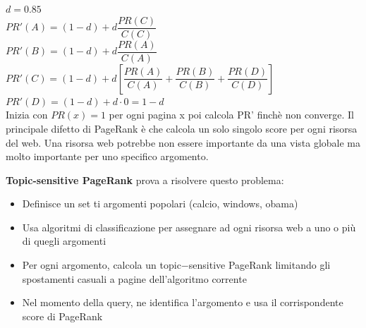 \noindent$d = 0.85$\\

\noindent$PR'(A) = (1 - d) + d\dfrac{PR(C)}{C(C)}$\vspace{0.1cm}\\
$PR'(B) = (1 - d) + d\dfrac{PR(A)}{C(A)}$\vspace{0.1cm}\\
$PR'(C) = (1 - d) + d\left[\dfrac{PR(A)}{C(A)} + \dfrac{PR(B)}{C(B)} + \dfrac{PR(D)}{C(D)} \right]$\vspace{0.1cm}\\
$PR'(D) = (1 - d) + d\cdot0 = 1 - d$\vspace{0.1cm}\\

Inizia con $PR(x) = 1$ per ogni pagina x poi calcola PR' finchè non converge. Il principale difetto di PageRank è che calcola un solo singolo score per ogni risorsa del web. Una risorsa web potrebbe non essere importante da una vista globale ma molto importante per uno specifico argomento. 

\textbf{Topic-sensitive PageRank} prova a risolvere questo problema:
\begin{itemize}
    \item Definisce un set ti argomenti popolari (calcio, windows, obama)
    \item Usa algoritmi di classificazione per assegnare ad ogni risorsa web a uno o più di quegli argomenti
    \item Per ogni argomento, calcola un topic$-$sensitive PageRank limitando gli spostamenti casuali a pagine dell'algoritmo corrente
    \item Nel momento della query, ne identifica l'argomento e usa il corrispondente score di PageRank 
\end{itemize}

